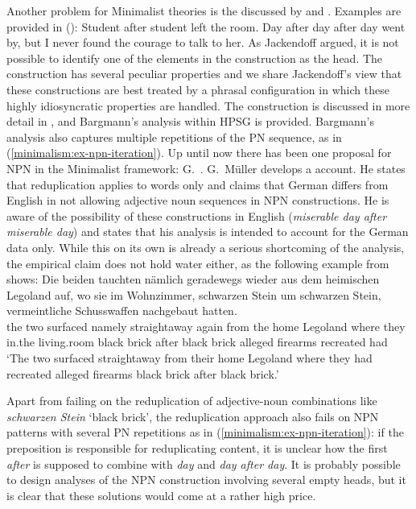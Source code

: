 \documentclass[output=paper
	        ,collection
	        ,collectionchapter
 	        ,biblatex
                ,babelshorthands
                ,newtxmath
                ,draftmode
                ,colorlinks, citecolor=brown
]{langscibook}
\begin{document}
Another problem for Minimalist theories is the  discussed by \citet{Matsuyama2004a} and \citet{Jackendoff2008a}. Examples are provided in ():
\eal
\ex Student after student left the room.
\ex
\label{minimalism:ex-npn-iteration}
Day after day after day went by, but I never found the courage to talk to
her. \citep{Bargmann2015a}
\zl
As Jackendoff argued, it is not possible to identify one of the elements in the construction as the
head. The construction has several peculiar properties and we share Jackendoff's view that these
constructions are best treated by a phrasal configuration in which these highly idiosyncratic
properties are handled. The construction is discussed in more detail in , and
Bargmann's analysis within HPSG is provided. Bargmann's analysis also captures multiple repetitions
of the PN sequence, as in (\ref{minimalism:ex-npn-iteration}). Up until now there has been one proposal for NPN in the Minimalist framework:
G.\ \citet{GMueller2011a}. G.\ Müller develops a  account. He states that reduplication
applies to words only and claims that German differs from English in not allowing adjective noun
sequences in NPN constructions. He is aware of the possibility of these constructions in English
(\emph{miserable day after miserable day}) and states that his analysis is intended to account for
the German data only. While this on its own is already a serious shortcoming of the analysis, the empirical claim
does not hold water either, as the following example from  shows:
\ea
\gll Die beiden tauchten nämlich geradewegs wieder aus dem heimischen Legoland auf, wo sie im
Wohnzimmer, schwarzen Stein um schwarzen Stein, vermeintliche Schusswaffen nachgebaut
hatten.\footnotemark\\
     the two    surfaced namely straightaway again   from the home Legoland \particle{} where they
     in.the living.room black brick after black brick alleged firearms recreated had\\%
{}
\glt `The two surfaced straightaway from their home Legoland where they had recreated alleged
firearms black brick after black brick.'
\z
\begin{sloppypar}
Apart from failing on the reduplication of adjective-noun combinations like \emph{schwar\-zen Stein}
`black brick', the reduplication approach also fails on NPN patterns with several PN repetitions as
in (\ref{minimalism:ex-npn-iteration}): if the preposition is responsible for reduplicating content, it is
unclear how the first \emph{after} is supposed to combine with \emph{day} and \emph{day after
  day}. It is probably possible to design analyses of the NPN construction involving
several empty heads, but it is clear that these solutions would come at a rather high price.
\end{sloppypar}
\end{document}
